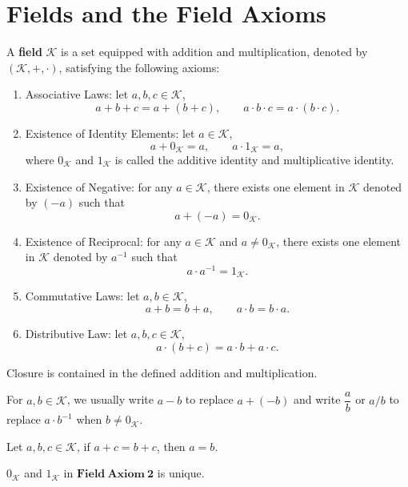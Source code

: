 	\section{Fields and the Field Axioms}
	\begin{definitionenv}
		A \textbf{field} $\mathcal{K}$ is a set equipped with addition and multiplication, denoted by $(\mathcal{K},+,\cdot)$, satisfying the following axioms:
		\begin{enumerate}
			\item Associative Laws: let $a,b,c \in \mathcal{K}$, $$a+b+c=a+(b+c), \qquad a\cdot b\cdot c=a\cdot (b\cdot c).$$
			\item Existence of Identity Elements: let $a\in \mathcal K$, $$a+0_{\mathcal{K}}=a,\qquad a\cdot 1_{\mathcal{K}}=a,$$ where $0_{\mathcal{K}}$ and $1_\mathcal{K}$ is called the additive identity and multiplicative identity.
			\item Existence of Negative: for any $a\in \mathcal{K}$, there exists one element in $\mathcal{K}$ denoted by $(-a)$ such that $$a+(-a)=0_\mathcal{K}.$$
			\item Existence of Reciprocal: for any $a\in \mathcal{K}$ and $a\neq 0_\mathcal{K}$, there exists one element in $\mathcal{K}$ denoted by $a^{-1}$ such that $$a\cdot a^{-1} = 1_\mathcal{K}.$$ 
			\item Commutative Laws: let $ a,b\in \mathcal{K}$, $$a+b=b+a, \qquad a\cdot b=b\cdot a.$$
			\item Distributive Law: let $a,b,c \in \mathcal{K}$, $$a\cdot (b+c)=a\cdot b + a\cdot c.$$
		\end{enumerate}
	\end{definitionenv}	
	\begin{remarkenv}
		Closure is contained in the defined addition and multiplication.
	\end{remarkenv}
    \begin{notationenv}
        For $a,b \in \mathcal{K}$, we usually write $a-b$ to replace $a+(-b)$ and write $\dfrac{a}{b}$ or $a/b$ to replace $a\cdot b^{-1}$ when $b\neq 0_\mathcal{K}$.
    \end{notationenv}
	\begin{theoremenv}
		Let $a,b,c \in \mathcal{K}$, if $a+c=b+c$, then $a=b$.
	\end{theoremenv}
	\begin{corollaryenv}
		$0_\mathcal{K}$ and $1_\mathcal{K}$ in $\mathbf{Field\ Axiom\ 2}$ is unique.
	\end{corollaryenv}
